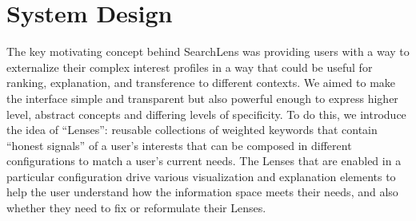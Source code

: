 

\section{System Design}


The key motivating concept behind SearchLens was providing users with a way to externalize their complex interest profiles in a way that could be useful for ranking, explanation, and transference to different contexts. We aimed to make the interface simple and transparent but also powerful enough to express higher level, abstract concepts and differing levels of specificity.
To do this, we introduce the idea of ``Lenses'': reusable collections of weighted keywords that contain ``honest signals'' of a user's interests that can be composed in different configurations to match a user's current needs. The Lenses that are enabled in a particular configuration drive various visualization and explanation elements to help the user understand how the information space meets their needs, and also whether they need to fix or reformulate their Lenses. 


